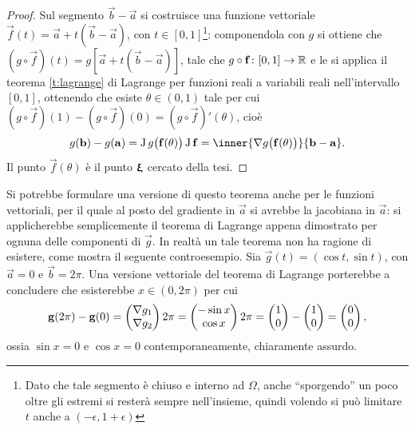 \begin{proof}
Sul segmento $\vec b-\vec a$ si costruisce una funzione vettoriale $\vec f(t)=\vec a+t(\vec b-\vec a)$, con $t\in[0,1]$\footnote{Dato che tale segmento è chiuso e interno ad $\Omega$, anche ``sporgendo'' un poco oltre gli estremi si resterà sempre nell'insieme, quindi volendo si può limitare $t$ anche a $(-\epsilon,1+\epsilon)$}: componendola con $g$ si ottiene che $(g\circ\vec f)(t)=g[\vec a+t(\vec b-\vec a)]$, tale che $g\circ\mathbf{f}\colon[0,1]\to\mathbb{R}$ e le si applica il teorema \ref{t:lagrange} di Lagrange per funzioni reali a variabili reali nell'intervallo $[0,1]$, ottenendo che esiste $\theta\in(0,1)$ tale per cui $(g\circ\vec f)(1)-(g\circ\vec f)(0)=(g\circ\vec f)'(\theta)$, cioè
\[
g(\vec b)-g(\vec a)=\jac g\big(\vec f(\theta)\big)\jac\vec f=\inner{\grad g\big(\vec f(\theta)\big)}{\vec b-\vec a}.
\]
Il punto $\vec f(\theta)$ è il punto $\bm{\upxi}$ cercato della tesi.
\end{proof}
Si potrebbe formulare una versione di questo teorema anche per le funzioni vettoriali, per il quale al posto del gradiente in $\vec a$ si avrebbe la jacobiana in $\vec a$: si applicherebbe semplicemente il teorema di Lagrange appena dimostrato per ognuna delle componenti di $\vec g$. In realtà un tale teorema non ha ragione di esistere, come mostra il seguente controesempio. Sia $\vec g(t)=(\cos t,\sin t)$, con $\vec a=0$ e $\vec b=2\pi$. Una versione vettoriale del teorema di Lagrange porterebbe a concludere che esisterebbe $x\in(0,2\pi)$ per cui
\[
\mathbf{g}(2\pi)-\mathbf{g}(0)=\begin{pmatrix}\nabla g_1\\\nabla g_2\end{pmatrix} 2\pi=\begin{pmatrix}-\sin x\\\cos x\end{pmatrix} 2\pi= \begin{pmatrix}1\\0\end{pmatrix}-\begin{pmatrix}1\\0\end{pmatrix}= \begin{pmatrix}0\\0\end{pmatrix},
\]
ossia $\sin x=0$ e $\cos x=0$ contemporaneamente, chiaramente assurdo.

